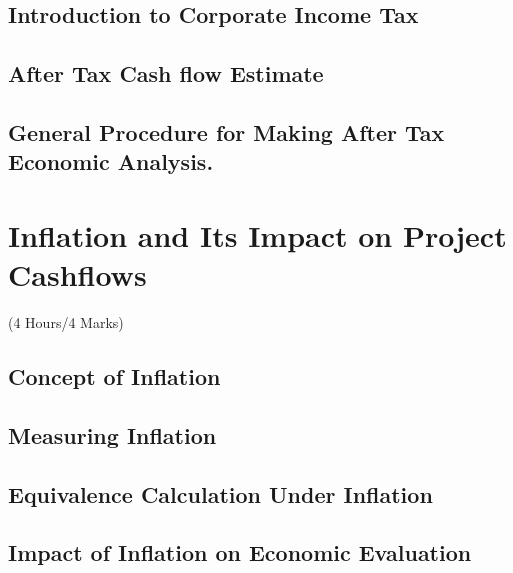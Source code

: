 \documentclass[12pt]{article}
\begin{document}
\subsection{Introduction to Corporate Income Tax}
\subsection{After Tax Cash flow Estimate}
\subsection{General Procedure for Making After Tax Economic Analysis.}

\pagebreak
\section{Inflation and Its Impact on Project Cashflows}
\begin{center}(4 Hours/4 Marks)\end{center}
\subsection{Concept of Inflation}
\subsection{Measuring Inflation}
\subsection{Equivalence Calculation Under Inflation}
\subsection{Impact of Inflation on Economic Evaluation}
\end{document}
